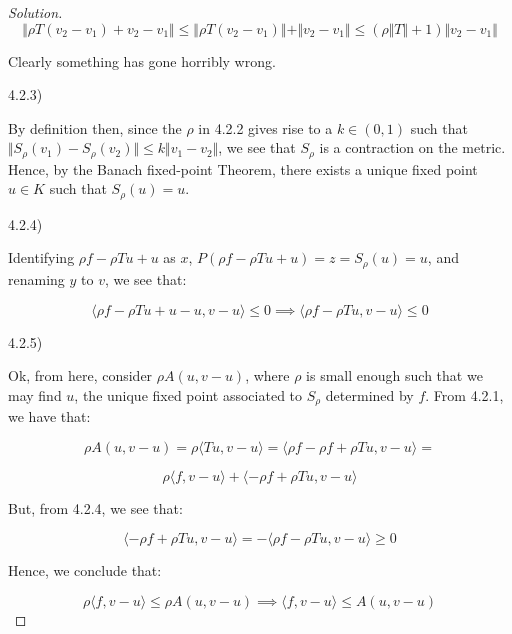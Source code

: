 \documentclass[10pt]{article}
\begin{document}
\begin{proof}[Solution]
$$ \Vert \rho T(v_2 - v_1) + v_2 - v_1 \Vert \leq \Vert \rho T(v_2 - v_1) \Vert +  \Vert v_2 - v_1 \Vert \leq (\rho \Vert T \Vert + 1) \Vert v_2 - v_1 \Vert $$

Clearly something has gone horribly wrong.

4.2.3)

By definition then, since the $\rho$ in 4.2.2 gives rise to a $k \in (0,1)$ such that $ \Vert  S_\rho(v_1) - S_\rho(v_2)  \Vert \leq k  \Vert v_1 - v_2 \Vert$, we see that $S_\rho$ is a contraction on the metric. Hence, by the Banach fixed-point Theorem, there exists a unique fixed point $u \in K$ such that $S_\rho(u) = u$.

4.2.4)

Identifying $ \rho f - \rho T u + u$ as $x$, $P( \rho f - \rho T u + u) = z = S_\rho(u) = u$, and renaming $y$ to $v$, we see that:

$$\langle \rho f - \rho Tu + u - u, v - u \rangle \leq 0 \implies \langle \rho f - \rho Tu, v - u \rangle \leq 0$$

4.2.5)

Ok, from here, consider $\rho A(u, v - u)$, where $\rho$ is small enough such that we may find $u$, the unique fixed point associated to $S_\rho$ determined by $f$. From 4.2.1, we have that:

$$ \rho A(u, v -u) = \rho \langle Tu, v - u \rangle = \langle \rho f - \rho f + \rho T u, v - u \rangle = $$

$$ \rho \langle f, v - u \rangle + \langle - \rho f + \rho Tu, v - u \rangle$$

But, from 4.2.4, we see that:

$$ \langle - \rho f + \rho Tu, v - u \rangle  = -  \langle \rho f - \rho Tu, v - u \rangle \geq 0 $$

Hence, we conclude that:

$$ \rho \langle f, v - u \rangle \leq \rho A(u, v - u) \implies \langle f, v - u \rangle \leq A(u, v - u) $$





\end{proof}
\end{document}
